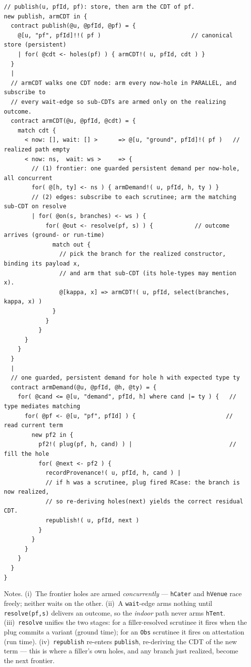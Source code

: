 \documentclass[11pt]{article}
\newcommand{\code}[1]{\lstinline[language=rho,basicstyle=\ttfamily\small]|#1|}
\begin{document}
\begin{lstlisting}[language=rho]
// publish(u, pfId, pf): store, then arm the CDT of pf.
new publish, armCDT in {
  contract publish(@u, @pfId, @pf) = {
    @[u, "pf", pfId]!!( pf )                          // canonical store (persistent)
    | for( @cdt <- holes(pf) ) { armCDT!( u, pfId, cdt ) }
  }
  |
  // armCDT walks one CDT node: arm every now-hole in PARALLEL, and subscribe to
  // every wait-edge so sub-CDTs are armed only on the realizing outcome.
  contract armCDT(@u, @pfId, @cdt) = {
    match cdt {
      < now: [], wait: [] >      => @[u, "ground", pfId]!( pf )   // realized path empty
      < now: ns,  wait: ws >     => {
        // (1) frontier: one guarded persistent demand per now-hole, all concurrent
        for( @[h, ty] <- ns ) { armDemand!( u, pfId, h, ty ) }
        // (2) edges: subscribe to each scrutinee; arm the matching sub-CDT on resolve
        | for( @on(s, branches) <- ws ) {
            for( @out <- resolve(pf, s) ) {            // outcome arrives (ground- or run-time)
              match out {
                // pick the branch for the realized constructor, binding its payload x,
                // and arm that sub-CDT (its hole-types may mention x).
                @[kappa, x] => armCDT!( u, pfId, select(branches, kappa, x) )
              }
            }
          }
      }
    }
  }
  |
  // one guarded, persistent demand for hole h with expected type ty
  contract armDemand(@u, @pfId, @h, @ty) = {
    for( @cand <= @[u, "demand", pfId, h] where cand |= ty ) {   // type mediates matching
      for( @pf <- @[u, "pf", pfId] ) {                          // read current term
        new pf2 in {
          pf2!( plug(pf, h, cand) ) |                            // fill the hole
          for( @next <- pf2 ) {
            recordProvenance!( u, pfId, h, cand ) |
            // if h was a scrutinee, plug fired RCase: the branch is now realized,
            // so re-deriving holes(next) yields the correct residual CDT.
            republish!( u, pfId, next )
          }
        }
      }
    }
  }
}
\end{lstlisting}

\noindent
Notes. (i)~The frontier holes are armed \emph{concurrently} --- \code{hCater} and \code{hVenue} race
freely; neither waits on the other. (ii)~A \code{wait}-edge arms nothing until \code{resolve(pf,s)}
delivers an outcome, so the \emph{indoor} path never arms \code{hTent}. (iii)~\code{resolve} unifies
the two stages: for a filler-resolved scrutinee it fires when the plug commits a variant (ground
time); for an \code{Obs} scrutinee it fires on attestation (run time). (iv)~\code{republish} re-enters
\code{publish}, re-deriving the CDT of the new term --- this is where a filler's own holes, and any
branch just realized, become the next frontier.
\end{document}
